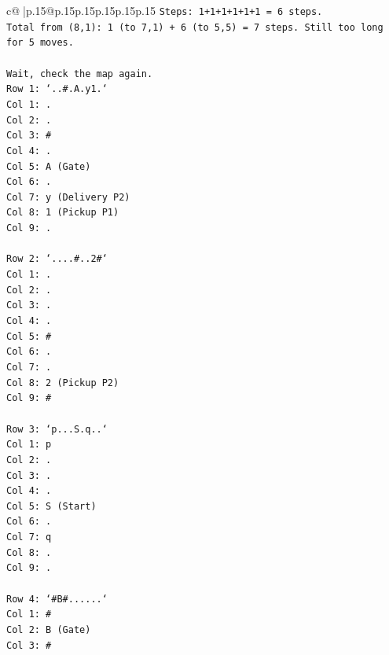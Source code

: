 \documentclass{article}
\begin{document}
{\begin{supertabular}{c@{$\;$}|p{.15\linewidth}@{}p{.15\linewidth}p{.15\linewidth}p{.15\linewidth}p{.15\linewidth}p{.15\linewidth}}
{{{\texttt{Steps: 1+1+1+1+1+1 = 6 steps.} \\
\texttt{Total from (8,1): 1 (to 7,1) + 6 (to 5,5) = 7 steps. Still too long for 5 moves.} \\
\\ 
\texttt{Wait, check the map again.} \\
\texttt{Row 1: `..\#.A.y1.`} \\
\texttt{Col 1: .} \\
\texttt{Col 2: .} \\
\texttt{Col 3: \#} \\
\texttt{Col 4: .} \\
\texttt{Col 5: A (Gate)} \\
\texttt{Col 6: .} \\
\texttt{Col 7: y (Delivery P2)} \\
\texttt{Col 8: 1 (Pickup P1)} \\
\texttt{Col 9: .} \\
\\ 
\texttt{Row 2: `....\#..2\#`} \\
\texttt{Col 1: .} \\
\texttt{Col 2: .} \\
\texttt{Col 3: .} \\
\texttt{Col 4: .} \\
\texttt{Col 5: \#} \\
\texttt{Col 6: .} \\
\texttt{Col 7: .} \\
\texttt{Col 8: 2 (Pickup P2)} \\
\texttt{Col 9: \#} \\
\\ 
\texttt{Row 3: `p...S.q..`} \\
\texttt{Col 1: p} \\
\texttt{Col 2: .} \\
\texttt{Col 3: .} \\
\texttt{Col 4: .} \\
\texttt{Col 5: S (Start)} \\
\texttt{Col 6: .} \\
\texttt{Col 7: q} \\
\texttt{Col 8: .} \\
\texttt{Col 9: .} \\
\\ 
\texttt{Row 4: `\#B\#......`} \\
\texttt{Col 1: \#} \\
\texttt{Col 2: B (Gate)} \\
\texttt{Col 3: \#} \\
}}}
\end{supertabular}}
\end{document}
